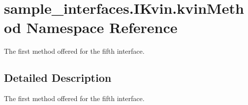 \hypertarget{namespacesample__interfaces_1_1_i_kvin_1_1kvin_method}{\section{sample\-\_\-interfaces.\-I\-Kvin.\-kvin\-Method Namespace Reference}
\label{namespacesample__interfaces_1_1_i_kvin_1_1kvin_method}
}


The first method offered for the fifth interface.  




\subsection{Detailed Description}
The first method offered for the fifth interface. 